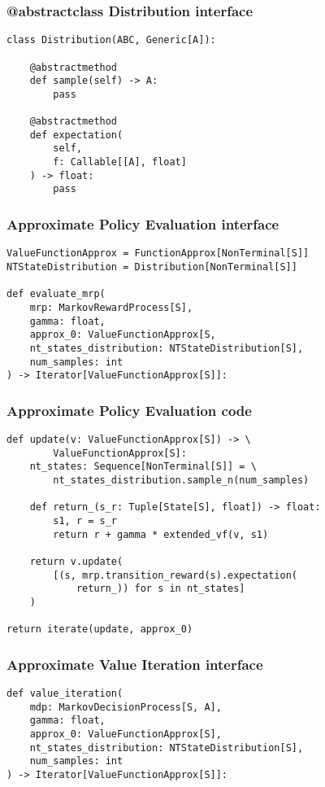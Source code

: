 \documentclass[handout]{beamer}
\begin{document}
\begin{frame}[fragile]
\frametitle{@abstractclass Distribution interface}
\pause
\begin{lstlisting}
class Distribution(ABC, Generic[A]):

    @abstractmethod
    def sample(self) -> A:
        pass

    @abstractmethod
    def expectation(
        self,
        f: Callable[[A], float]
    ) -> float:
        pass
\end{lstlisting}
\end{frame}


\begin{frame}[fragile]
\frametitle{Approximate Policy Evaluation interface}
\pause
\begin{lstlisting}
ValueFunctionApprox = FunctionApprox[NonTerminal[S]]
NTStateDistribution = Distribution[NonTerminal[S]]

def evaluate_mrp(
    mrp: MarkovRewardProcess[S],
    gamma: float,
    approx_0: ValueFunctionApprox[S,
    nt_states_distribution: NTStateDistribution[S],
    num_samples: int
) -> Iterator[ValueFunctionApprox[S]]:
\end{lstlisting}
\end{frame}

\begin{frame}[fragile]
\frametitle{Approximate Policy Evaluation code}
\pause
\begin{lstlisting}
def update(v: ValueFunctionApprox[S]) -> \
        ValueFunctionApprox[S]:
    nt_states: Sequence[NonTerminal[S]] = \
        nt_states_distribution.sample_n(num_samples)

    def return_(s_r: Tuple[State[S], float]) -> float:
        s1, r = s_r
        return r + gamma * extended_vf(v, s1)

    return v.update(
        [(s, mrp.transition_reward(s).expectation(
            return_)) for s in nt_states]
    )

return iterate(update, approx_0)
\end{lstlisting}
\end{frame}

\begin{frame}[fragile]
\frametitle{Approximate Value Iteration interface}
\pause
\begin{lstlisting}
def value_iteration(
    mdp: MarkovDecisionProcess[S, A],
    gamma: float,
    approx_0: ValueFunctionApprox[S],
    nt_states_distribution: NTStateDistribution[S],
    num_samples: int
) -> Iterator[ValueFunctionApprox[S]]:
\end{lstlisting}
\end{frame}
\end{document}
